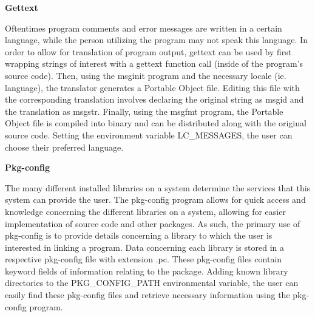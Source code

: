 \documentclass{article}
\begin{document}
\large{\textbf{Gettext}}

	Oftentimes program comments and error messages are written in a certain language,
while the person utilizing the program may not speak this language. In order to allow for
translation of program output, gettext can be used by first wrapping strings of interest
with a gettext function call (inside of the program's source code). Then, using the msginit
program and the necessary locale (ie. language), the translator generates a Portable Object
file. Editing this file with the corresponding translation involves declaring the original
string as msgid and the translation as msgstr. Finally, using the msgfmt program, the Portable
Object file is compiled into binary and can be distributed along with the original source code.
Setting the environment variable LC\_MESSAGES, the user can choose their preferred language.

\large{\textbf{Pkg-config}}

	The many different installed libraries on a system determine the services that
this system can provide the user. The pkg-config program allows for quick access and knowledge
concerning the different libraries on a system, allowing for easier implementation of source
code and other packages. As such, the primary use of pkg-config is to provide details concerning
a library to which the user is interested in linking a program. Data concerning each library is
stored in a respective pkg-config file with extension .pc. These pkg-config files contain 
keyword fields of information relating to the package. Adding known library directories to the
PKG\_CONFIG\_PATH environmental variable, the user can easily find these pkg-config files and
retrieve necessary information using the pkg-config program.
\end{document}
